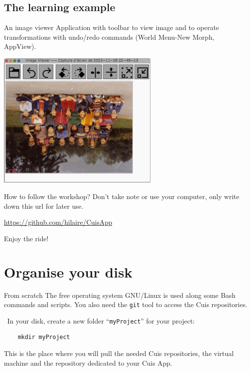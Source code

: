 \documentclass{beamer}
\newcommand{\tip}{\boldmath{\textcolor{red}{$\Rightarrow$}}}
\begin{document}
\subsection{The learning example}
\begin{frame}{An image viewer}
  Application with toolbar to view image and to operate
  transformations with undo/redo commands (World Menu-New Morph, AppView).
\begin{center}
  \includegraphics[width=0.6\textwidth]{CuisApp.png}
\end{center}
\end{frame}
%
\begin{frame}{How to follow the workshop?}
  Don't take note or use your computer, only write down this url for later use.
  \vspace*{2cm}
  \fontsize{16pt}{8pt}\selectfont
  \begin{center}
   \url{https://github.com/hilaire/CuisApp}
  \end{center}
  \fontsize{11pt}{8pt}\selectfont
  \vspace*{2cm}
  \begin{flushright}
   Enjoy the ride!
 \end{flushright}
\end{frame}

\section{Organise your disk}
\begin{frame}[fragile]{From scratch}
  The free operating system GNU/Linux is used along some Bash commands
  and scripts. You also need the \texttt{git} tool to access the Cuis
  repositories.
  
  \tip\ In your disk, create a new folder ``\texttt{myProject}'' for
  your project:
\begin{verbatim}
    mkdir myProject
\end{verbatim}

  This is the place where you will pull the needed Cuis repositories,
  the virtual machine and the repository dedicated to your Cuis App.
\end{frame}
\end{document}
